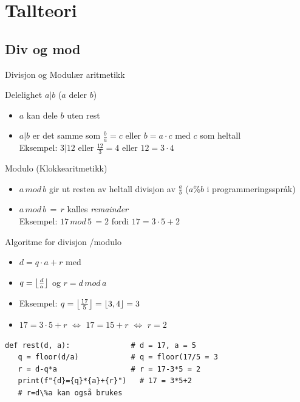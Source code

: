 \section{Tallteori}
\subsection*{Div og mod}
\begin{frame}{Divisjon og Modulær aritmetikk}
\begin{block}{Delelighet $a|b$ ($a$ deler $b$)}
\begin{itemize}
\item $a$ kan dele $b$ uten rest
\item $a|b$ er det samme som $\frac{b}{a}=c$ eller $b=a\cdot c$ med $c$ som heltall\\
Eksempel: $3|12$ eller $\frac{12}{3} = 4$ eller $12=3\cdot 4$
\end{itemize}
\end{block}
\pause
\begin{block}{Modulo (Klokkearitmetikk)}
\begin{itemize}
\item $a\, mod\, b$ gir ut resten av heltall divisjon av $\frac{a}{b}$ ($a\%b$ i programmeringsspråk)
\item $a\, mod\, b\, =\, r$ kalles \textit{remainder}\\
Eksempel: $17\, mod\, 5\, = 2$ fordi $17=3\cdot 5+2$ 
\end{itemize}
\end{block}
\end{frame}

\begin{frame}[fragile]{Algoritme for divisjon /modulo}
\begin{itemize}[<+->]
\item $d=q\cdot a + r$ med
\item $q=\floor*{\frac{d}{a}}$ og $r=d\, mod\, a$
\item Eksempel: $q=\floor*{\frac{17}{5}} = \floor*{3,4}=3$
\item $17=3\cdot 5 + r$ $\iff$ $17=15+r$ $\iff$ $r=2$
\end{itemize}
\pause
\begin{verbatim}
def rest(d, a):              # d = 17, a = 5
   q = floor(d/a)            # q = floor(17/5 = 3
   r = d-q*a                 # r = 17-3*5 = 2
   print(f"{d}={q}*{a}+{r}")   # 17 = 3*5+2
   # r=d\%a kan også brukes
   
\end{verbatim}
\end{frame}

